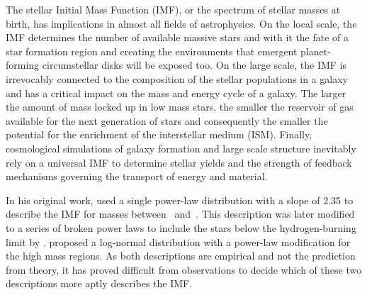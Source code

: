 The stellar Initial Mass Function (IMF), or the spectrum of stellar masses at birth, has implications in almost all fields of astrophysics. On the local scale, the IMF determines the number of available massive stars and with it the fate of a star formation region and creating the environments that emergent planet-forming circumstellar disks will be exposed too. 
On the large scale, the IMF is irrevocably connected to the composition of the stellar populations in a galaxy and has a critical impact on the mass and energy cycle of a galaxy. The larger the amount of mass locked up in low mass stars, the smaller the reservoir of gas available for the next generation of stars and consequently the smaller the potential for the enrichment of the interstellar medium (ISM). Finally, cosmological simulations of galaxy formation and large scale structure inevitably rely on a universal IMF to determine stellar yields and the strength of feedback mechanisms governing the transport of energy and material. 


In his original work, \citet{salpeter1955} used a single power-law distribution with a slope of 2.35 to describe the IMF for masses between \ and \,\msun . This description was later modified to a series of broken power laws to include the stars below the hydrogen-burning limit by \citet{kroupa2001}. \citet{chabrier2005} proposed a log-normal distribution with a power-law modification for the high mass regions. As both descriptions are empirical and not the prediction from theory, it has proved difficult from observations to decide which of these two descriptions more aptly describes the IMF.


